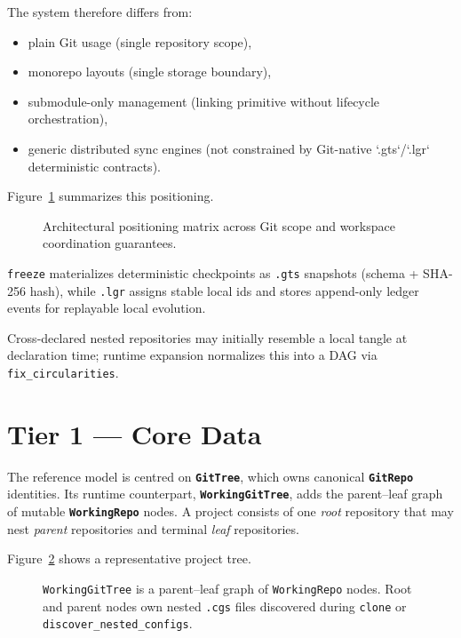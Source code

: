 The system therefore differs from:
\begin{itemize}
  \item plain Git usage (single repository scope),
  \item monorepo layouts (single storage boundary),
  \item submodule-only management (linking primitive without lifecycle
    orchestration),
  \item generic distributed sync engines (not constrained by Git-native
    `.gts`/`.lgr` deterministic contracts).
\end{itemize}

Figure~\ref{fig:positioning-matrix} summarizes this positioning.

\begin{figure}[ht]
\centering
\caption{Architectural positioning matrix across Git scope and workspace
  coordination guarantees.}
\label{fig:positioning-matrix}

\end{figure}

\texttt{freeze} materializes deterministic checkpoints as
\texttt{.gts} snapshots (schema + SHA-256 hash), while \texttt{.lgr}
assigns stable local ids and stores append-only ledger events for replayable
local evolution.

Cross-declared nested repositories may initially resemble a local tangle at
declaration time; runtime expansion normalizes this into a DAG via
\texttt{fix\_circularities}.

\section{Tier 1 — Core Data}
\label{sec:tier-core}

The reference model is centred on \textbf{\texttt{GitTree}}, which owns
canonical \textbf{\texttt{GitRepo}} identities. Its runtime counterpart,
\textbf{\texttt{WorkingGitTree}}, adds the parent--leaf graph of mutable
\textbf{\texttt{WorkingRepo}} nodes. A project consists of one \emph{root}
repository that may nest \emph{parent} repositories and terminal \emph{leaf}
repositories.

Figure~\ref{fig:gittree-nodes} shows a representative project tree.

\begin{figure}[ht]
\centering
\caption{\texttt{WorkingGitTree} is a parent--leaf graph of
  \texttt{WorkingRepo} nodes.
  Root and parent nodes own nested \texttt{.cgs} files discovered during
  \texttt{clone} or \texttt{discover\_nested\_configs}.}
\label{fig:gittree-nodes}

\end{figure}

